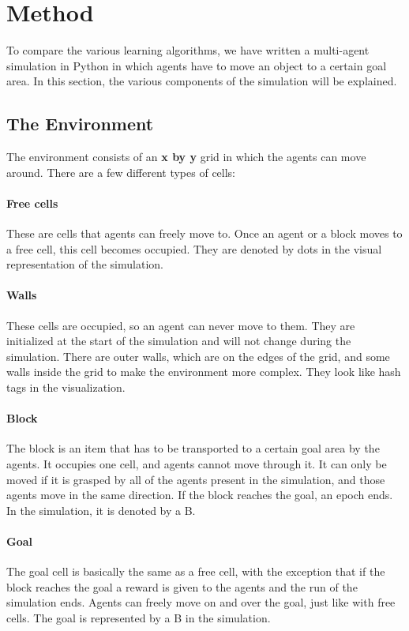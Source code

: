 \section{Method}
To compare the various learning algorithms, we have written a multi-agent simulation in Python in which agents have to move an object to a certain goal area. In this section, the various components of the simulation will be explained.
\subsection{The Environment}
The environment consists of an \textbf{x by y} grid in which the agents can move around. There are a few different types of cells:
\paragraph{Free cells}
These are cells that agents can freely move to. Once an agent or a block moves to a free cell, this cell becomes occupied. They are denoted by dots in the visual representation of the simulation.
\paragraph{Walls}
These cells are occupied, so an agent can never move to them. They are initialized at the start of the simulation and will not change during the simulation. There are outer walls, which are on the edges of the grid, and some walls inside the grid to make the environment more complex. They look like hash tags in the visualization.
\paragraph{Block}
The block is an item that has to be transported to a certain goal area by the agents. It occupies one cell, and agents cannot move through it. It can only be moved if it is grasped by all of the agents present in the simulation, and those agents move in the same direction. If the block reaches the goal, an epoch ends. In the simulation, it is denoted by a B.
\paragraph{Goal}
The goal cell is basically the same as a free cell, with the exception that if the block reaches the goal a reward is given to the agents and the run of the simulation ends. Agents can freely move on and over the goal, just like with free cells. The goal is represented by a B in the simulation.
